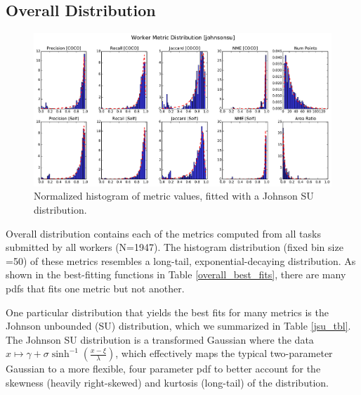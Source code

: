 \documentclass[12pt]{article}
\begin{document}
\subsection{Overall Distribution}
\begin{figure}[ht]
\centering
\includegraphics[width=\linewidth]{plots/johnsonsu_fitted_metric_histogram.pdf}
\caption{Normalized histogram of metric values, fitted with a Johnson SU distribution. }
\label{metric_hist}
\end{figure}
\par Overall distribution contains each of the metrics computed from all tasks submitted by all workers (N=1947). The histogram distribution (fixed bin size =50) of these metrics resembles a long-tail, exponential-decaying distribution. As shown in the best-fitting functions in Table \ref{overall_best_fits}, there are many pdfs that fits one metric but not another. 
\par One particular distribution that yields the best fits for many metrics is the Johnson unbounded (SU) distribution, which we summarized in Table \ref{jsu_tbl}. The Johnson SU distribution is a transformed Gaussian where the data $x\mapsto\gamma+\sigma \sinh^{-1}(\frac{x-\xi}{\lambda})$, which effectively maps the typical two-parameter Gaussian to a more flexible, four parameter pdf to better account for the skewness (heavily right-skewed) and kurtosis (long-tail) of the distribution.

\end{document}
